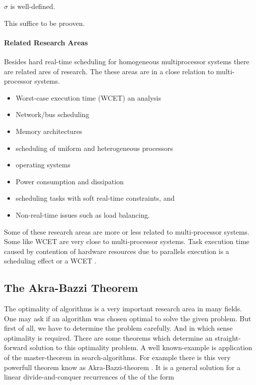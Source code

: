 	
	\begin{lemma}
	 $\sigma$ is well-defined.
	\end{lemma}
	This suffice to be prooven.
	
	\paragraph{Related Research Areas}
	\label{par:RelatedResearchAreas}
	
		Besides hard real-time scheduling for homogeneous multiprocessor systems there are related ares of research. The these areas are in a  close relation to multi-processor systems.
		\begin{itemize}
		\item Worst-case execution time (WCET) an analysis
		\item Network/bus scheduling
		\item Memory architectures
		\item scheduling of uniform and heterogeneous processors
		\item operating systems
		\item Power consumption and dissipation
		\item scheduling tasks with soft real-time constraints, and
		\item Non-real-time issues such as load balancing.
		\end{itemize}
		Some of these research areas are more or less related to multi-processor systems. Some like WCET are very close to multi-processor systems.
		Task execution time caused by contention of hardware resources due to parallels execution is a scheduling effect or a WCET \cite[Sec. 10.2]{DB2011}.
		
 
\subsection{The Akra-Bazzi Theorem}
\label{subsection:The Akra-Bazzi Theorem}

	The optimality of algorithms is a very important research area in many fields.
	One may ask if an algorithm was chosen optimal to solve the given problem.
	But first of all, we have to determine the problem carefully. And in which sense optimality is required. There are some theorems which determine an straight-forward solution to this optimality problem. A well known-example is application of the master-theorem in search-algorithms. %
	For example there is this very powerfull theorem know as Akra-Bazzi-theorem \cite{AB98}.
	It is a general solution for a linear divide-and-conquer recurrences of the of the form

